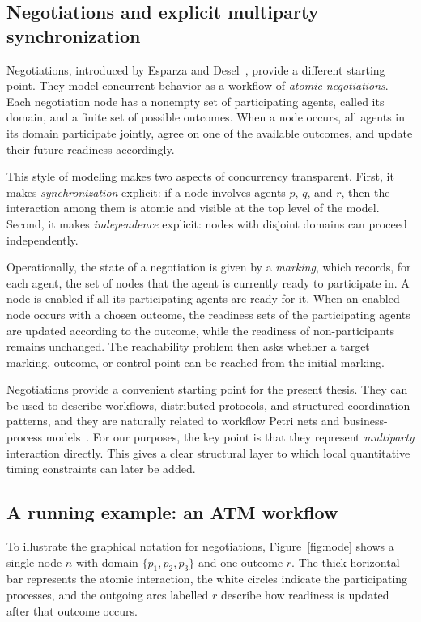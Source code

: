 \subsection{Negotiations and explicit multiparty synchronization}

Negotiations, introduced by Esparza and Desel~\cite{EsparzaDeselNegotiations}, provide a different starting point. They model concurrent behavior as a workflow of \emph{atomic negotiations}. Each negotiation node has a nonempty set of participating agents, called its domain, and a finite set of possible outcomes. When a node occurs, all agents in its domain participate jointly, agree on one of the available outcomes, and update their future readiness accordingly.

This style of modeling makes two aspects of concurrency transparent. First, it makes \emph{synchronization} explicit: if a node involves agents $p$, $q$, and $r$, then the interaction among them is atomic and visible at the top level of the model. Second, it makes \emph{independence} explicit: nodes with disjoint domains can proceed independently.

Operationally, the state of a negotiation is given by a \emph{marking}, which records, for each agent, the set of nodes that the agent is currently ready to participate in. A node is enabled if all its participating agents are ready for it. When an enabled node occurs with a chosen outcome, the readiness sets of the participating agents are updated according to the outcome, while the readiness of non-participants remains unchanged. The reachability problem then asks whether a target marking, outcome, or control point can be reached from the initial marking.

Negotiations provide a convenient starting point for the present thesis. They can be used to describe workflows, distributed protocols, and structured coordination patterns, and they are naturally related to workflow Petri nets and business-process models~\cite{EsparzaWorkflow,EsparzaFreeChoice}. For our purposes, the key point is that they represent \emph{multiparty} interaction directly. This gives a clear structural layer to which local quantitative timing constraints can later be added.

\subsection{A running example: an ATM workflow}

To illustrate the graphical notation for negotiations, Figure~\ref{fig:node}
shows a single node \(n\) with domain \(\{p_1,p_2,p_3\}\) and one outcome \(r\).
The thick horizontal bar represents the atomic interaction, the white circles
indicate the participating processes, and the outgoing arcs labelled \(r\)
describe how readiness is updated after that outcome occurs.

